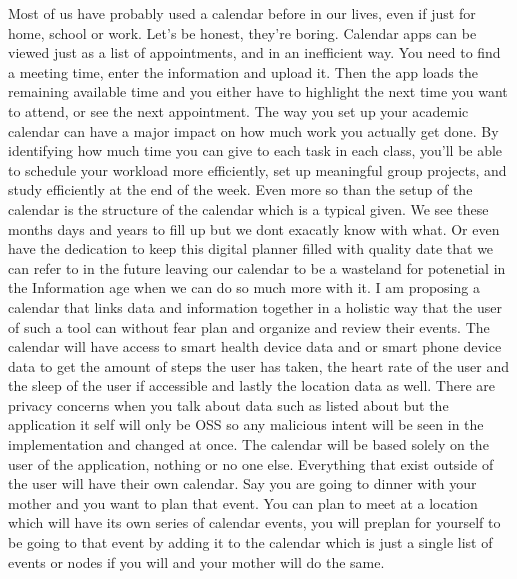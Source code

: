 
Most of us have probably used a calendar before in our lives, even if just for home, school or work. Let's be honest, they're boring. Calendar apps can be viewed just as a list of appointments, and in an inefficient way. You need to find a meeting time, enter the information and upload it. Then the app loads the remaining available time and you either have to highlight the next time you want to attend, or see the next appointment.
The way you set up your academic calendar can have a major impact on how much work you actually get done. By identifying how much time you can give to each task in each class, you'll be able to schedule your workload more efficiently, set up meaningful group projects, and study efficiently at the end of the week.
Even more so than the setup of the calendar is the structure of the calendar which is a typical given. We see these months days and years to fill up but we dont exacatly know with what. Or even have the dedication to keep this digital planner filled with quality date that we can refer to in the future leaving our calendar to be a wasteland for potenetial in the Information age when we can do so much more with it.
I am proposing a calendar that links data and information together in a holistic way that the user of such a tool can without fear plan and organize and review their events.
The calendar will have access to smart health device data and or smart phone device data to get the amount of steps the user has taken, the heart rate of the user and the sleep of the user if accessible and lastly the location data as well.
There are privacy concerns when you talk about data such as listed about but the application it self will only be OSS so any malicious intent will be seen in the implementation and changed at once.
The calendar will be based solely on the user of the application, nothing or no one else. Everything that exist outside of the user will have their own calendar. Say you are going to dinner with your mother and you want to plan that event. You can plan to meet at a location which will have its own series of calendar events, you will preplan for yourself to be going to that event by adding it to the calendar which is just a single list of events or nodes if you will and your mother will do the same.